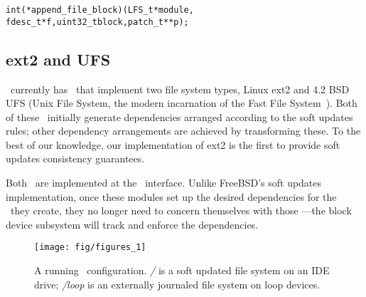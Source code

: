 \begin{small}
\begin{alltt}
int (*append_file_block)(LFS_t *module, 
   fdesc_t *f, uint32_t block, patch_t **p);
\end{alltt}
\end{small}

\begin{comment}
\noindent
This design lets \LFS\ modules examine and modify the dependency structure.
\end{comment}



\subsection{ext2 and UFS}

\Kudos\ currently has \modules\ that implement two file system types, Linux
ext2 and 4.2 BSD UFS (Unix File System, the modern incarnation of the Fast File
System~\cite{mckusick84fast}).
%
Both of these \modules\ initially generate dependencies arranged according to the
soft updates rules; other dependency arrangements are achieved by transforming these.
To the best of our knowledge, our implementation of ext2 is the first to provide
soft updates consistency guarantees.
%

Both \modules\ are implemented at the \LFS\ interface. 
%
%
%
%
Unlike FreeBSD's soft updates implementation, once these modules set up the
desired dependencies for the \patches\ they create, they no longer need to
concern themselves with those \patches---the block device subsystem will track
and enforce the dependencies.


\begin{figure}[t]
  \centering
  \texttt{[image: fig/figures\_1]}
  \caption{A running \Kudos\ configuration. {\it/} is a soft updated
    file system on an IDE drive; {\it/loop} is an externally journaled
    file system on loop devices.}
  \label{fig:kfs-graph}
\end{figure}


